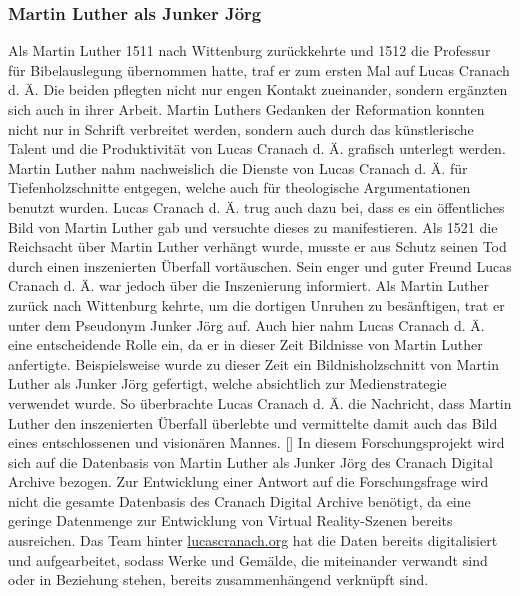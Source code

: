 \documentclass[a4paper,12pt,oneside]{article}
\begin{document}
    \subsubsection{Martin Luther als Junker Jörg}
      Als Martin Luther 1511 nach Wittenburg zurückkehrte und 1512 die Professur für
      Bibelauslegung übernommen hatte, traf er zum ersten Mal auf Lucas Cranach d. Ä.
      Die beiden pflegten nicht nur engen Kontakt zueinander, sondern ergänzten sich auch
      in ihrer Arbeit. Martin Luthers Gedanken der Reformation konnten nicht nur in
      Schrift verbreitet werden, sondern auch durch das künstlerische Talent und die
      Produktivität von Lucas Cranach d. Ä. grafisch unterlegt werden. 
      Martin Luther nahm nachweislich die Dienste von 
      Lucas Cranach d. Ä. für Tiefenholzschnitte entgegen, welche auch für
      theologische Argumentationen benutzt wurden. Lucas Cranach d. Ä. trug auch
      dazu bei, dass es ein öffentliches Bild von Martin Luther gab und versuchte dieses
      zu manifestieren. Als 1521 die Reichsacht über Martin Luther verhängt wurde, 
      musste er aus Schutz seinen Tod durch einen inszenierten Überfall vortäuschen.
      Sein enger und guter Freund Lucas Cranach d. Ä. war jedoch über die Inszenierung 
      informiert. 
      Als Martin Luther zurück nach Wittenburg kehrte, um die dortigen Unruhen zu besänftigen, 
      trat er unter dem Pseudonym \glqq Junker Jörg\grqq{} auf. 
      Auch hier nahm Lucas Cranach d. Ä. eine entscheidende Rolle ein, da er in dieser 
      Zeit Bildnisse von Martin Luther anfertigte. 
      Beispielsweise wurde zu dieser Zeit ein Bildnisholzschnitt
      von Martin Luther als Junker Jörg gefertigt, welche absichtlich zur Medienstrategie
      verwendet wurde. So überbrachte Lucas Cranach d. Ä. die Nachricht, dass Martin Luther
      den inszenierten Überfall überlebte und vermittelte damit auch das Bild eines 
      entschlossenen und visionären Mannes. [\cite{heydenreich2017lucas}]
      \newline
      In diesem Forschungsprojekt wird sich auf die Datenbasis von Martin Luther als
      Junker Jörg des Cranach Digital Archive bezogen. Zur Entwicklung einer Antwort auf
      die Forschungsfrage wird nicht die gesamte Datenbasis des Cranach Digital Archive
      benötigt, da eine geringe Datenmenge zur Entwicklung von Virtual Reality-Szenen
      bereits ausreichen. Das Team hinter \url{lucascranach.org} hat die Daten bereits
      digitalisiert und aufgearbeitet, sodass Werke und Gemälde, die miteinander
      verwandt sind oder in Beziehung stehen, bereits zusammenhängend verknüpft sind.
\end{document}
